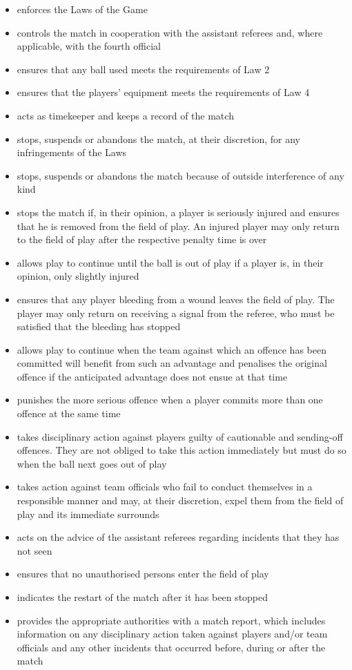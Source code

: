 \begin{itemize}
    \item enforces the Laws of the Game
    \item controls the match in cooperation with the assistant referees and, where applicable, with the fourth official
    \item ensures that any ball used meets the requirements of Law 2
    \item ensures that the players' equipment meets the requirements of Law 4
    \item acts as timekeeper and keeps a record of the match
    \item stops, suspends or abandons the match, at their discretion, for any infringements of the Laws
    \item stops, suspends or abandons the match because of outside interference of any kind
    \item stops the match if, in their opinion, a player is seriously injured and ensures that he is removed from the field of play. An injured player may only return to the field of play after the respective penalty time is over 
    \item allows play to continue until the ball is out of play if a player is, in their opinion, only slightly injured
    \item ensures that any player bleeding from a wound leaves the field of play. The player may only return on receiving a signal from the referee, who must be satisfied that the bleeding has stopped
    \item allows play to continue when the team against which an offence has been committed will benefit from such an advantage and penalises the original offence if the anticipated advantage does not ensue at that time
    \item punishes the more serious offence when a player commits more than one offence at the same time
    \item takes disciplinary action against players guilty of cautionable and sending-off offences. They are not obliged to take this action immediately but must do so when the ball next goes out of play
    \item takes action against team officials who fail to conduct themselves in a responsible manner and may, at their discretion, expel them from the field of play and its immediate surrounds
    \item acts on the advice of the assistant referees regarding incidents that they has not seen
    \item ensures that no unauthorised persons enter the field of play
    \item indicates the restart of the match after it has been stopped
    \item provides the appropriate authorities with a match report, which includes information on any disciplinary action taken against players and/or team officials and any other incidents that occurred before, during or after
    the match
\end{itemize}

